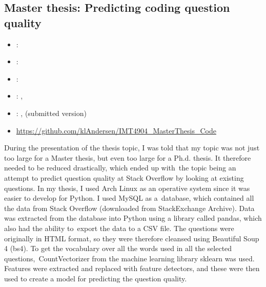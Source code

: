 \subsection{Master thesis: Predicting coding question quality}
\label{sec:master_thesis}
\begin{itemize} 
	\item {}: 
	\item {}: 
	\item {}: 
	\item {}: , 
	\item {}: ,  (submitted version)
	\item {} \url{https://github.com/klAndersen/IMT4904_MasterThesis_Code}
\end{itemize} 
During the presentation of the thesis topic, I was told that my topic was not just too large for a Master thesis, but even too large for a Ph.d. thesis. 
It therefore needed to be reduced drastically, which ended up with the topic being an attempt to predict question quality at Stack Overflow by looking at existing questions. 
\vspace{0.5em}\newline
In my thesis, I used Arch Linux as an operative system since it was easier to develop for Python. 
I used MySQL as a database, which contained all the data from Stack Overflow (downloaded from StackExchange Archive). 
Data was extracted from the database into Python using a library called pandas, which also had the ability to export the data to a CSV file. 
\vspace{0.5em}\newline
The questions were originally in HTML format, so they were therefore cleansed using Beautiful Soup 4 (bs4). 
To get the vocabulary over all the words used in all the selected questions, CountVectorizer from the machine learning library sklearn was used. 
Features were extracted and replaced with feature detectors, and these were then used to create a model for predicting the question quality. 
